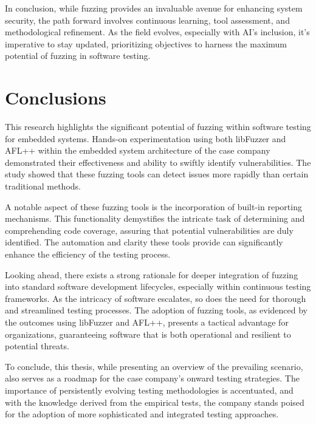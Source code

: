 In conclusion, while fuzzing provides an invaluable avenue for enhancing system
security, the path forward involves continuous learning, tool assessment,
and methodological refinement. As the field evolves, especially with AI's inclusion,
it's imperative to stay updated, prioritizing objectives to harness the maximum
potential of fuzzing in software testing.

\section{Conclusions}
This research highlights the significant potential of fuzzing within software
testing for embedded systems. Hands-on experimentation using both
libFuzzer and AFL++ within the embedded system architecture of the case company
demonstrated their effectiveness and ability to swiftly identify vulnerabilities.
The study showed that these fuzzing tools can detect issues more rapidly than
certain traditional methods.

A notable aspect of these fuzzing tools is the incorporation of built-in
reporting mechanisms. This functionality demystifies the intricate task of
determining and comprehending code coverage, assuring that potential
vulnerabilities are duly identified. The automation and clarity these tools
provide can significantly enhance the efficiency of the testing process.

Looking ahead, there exists a strong rationale for deeper integration of
fuzzing into standard software development lifecycles, especially within
continuous testing frameworks. As the intricacy of software escalates, so does
the need for thorough and streamlined testing processes. The adoption of
fuzzing tools, as evidenced by the outcomes using libFuzzer and AFL++, presents
a tactical advantage for organizations, guaranteeing software that is both
operational and resilient to potential threats.

To conclude, this thesis, while presenting an overview of the prevailing
scenario, also serves as a roadmap for the case company's onward
testing strategies. The importance of persistently evolving testing
methodologies is accentuated, and with the knowledge derived from
the empirical tests, the company stands poised for the adoption of more
sophisticated and integrated testing approaches.